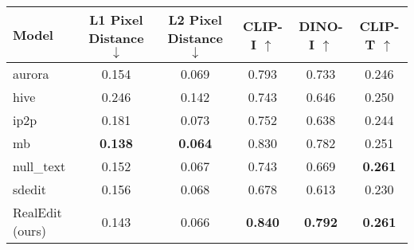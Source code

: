 \begin{tabular}{lccccc}
    \hline
    \textbf{Model} & \textbf{L1 Pixel Distance} $\downarrow$ & \textbf{L2 Pixel Distance} $\downarrow$ & \textbf{CLIP-I} $\uparrow$ & \textbf{DINO-I} $\uparrow$ & \textbf{CLIP-T} $\uparrow$ \\
    \hline
    aurora            & 0.154 & 0.069 & 0.793 & 0.733 & 0.246 \\
    hive              & 0.246 & 0.142 & 0.743 & 0.646 & 0.250 \\
    ip2p              & 0.181 & 0.073 & 0.752 & 0.638 & 0.244 \\
    mb                & \textbf{0.138} & \textbf{0.064} & 0.830 & 0.782 & 0.251 \\
    null\_text        & 0.152 & 0.067 & 0.743 & 0.669 & \textbf{0.261} \\
    sdedit            & 0.156 & 0.068 & 0.678 & 0.613 & 0.230 \\
    RealEdit (ours)   & 0.143 & 0.066 & \textbf{0.840} & \textbf{0.792} & \textbf{0.261} \\ 
    \hline
\end{tabular}

